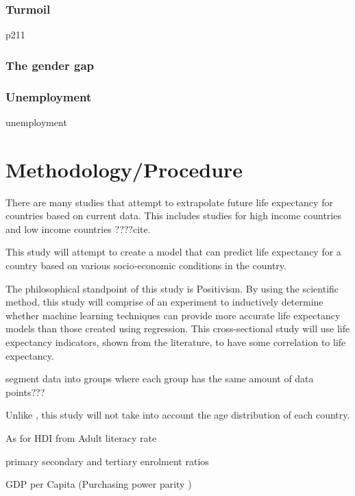 \documentclass[12pt,a4paper]{article}
\begin{document}
\cite{CDC1999}

\subsubsection{Turmoil}
\citep{Low2008} p211

\subsubsection{The gender gap}

\cite{Rochelle2015}

\subsubsection{Unemployment}
unemployment \cite{Bonamore2015} \cite{Roelfs2011} \cite{Roelfs2015} 

\section{Methodology/Procedure}

There are many studies that attempt to extrapolate future life expectancy for countries based on current data. This includes studies for high income countries \citep{Kontis2017} and low income countries ????{cite}.

This study will attempt to create a model that can predict life expectancy for a country based on various socio-economic conditions in the country.

The philosophical standpoint of this study is Positivism. By using the scientific method, this study will comprise of an experiment to inductively determine whether machine learning techniques can provide more accurate life expectancy models than those created using regression. This cross-sectional study will use life expectancy indicators, shown from the literature, to have some correlation to life expectancy.




segment data into groups where each group has the same amount of data points???

Unlike \cite{Shaw2005}, this study will not take into account the age distribution of each country.

As for HDI from \cite{Bulled2010}
Adult literacy rate

primary secondary and tertiary enrolment ratios

GDP per Capita (Purchasing power parity )
\end{document}
